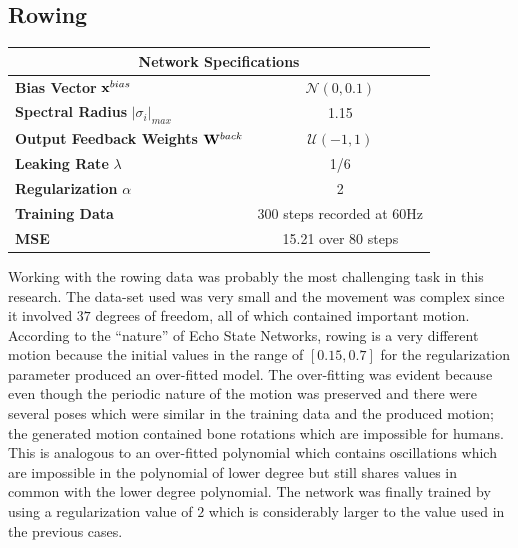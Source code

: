 \documentclass[letterpaper,9pt]{article}
\newcommand{\networkSpecs}[7]{
  \begin{center}
  \begin{tabular}{ | l | c | }
    \hline
    \multicolumn{2}{|c|}{{\bf Network Specifications}} \\
    \hline
    {\bf Bias Vector} ${\bf x}^{bias}$ & $\mathcal{N}(#1)$ \\
    \hline
    {\bf Spectral Radius} $|\sigma_i|_{max}$ & #2 \\
    \hline
    {\bf Output Feedback Weights} ${\bf W}^{back}$ & $\mathcal{U}(#3)$ \\
    \hline
    {\bf Leaking Rate} $\lambda$ & #4 \\
    \hline
    {\bf Regularization} $\alpha$ & #5\\
    \hline
    {\bf Training Data} & #6\\
    \hline
    {\bf MSE} & #7\\
    \hline
  \end{tabular}    
  \end{center}
}
\begin{document}
\subsection{Rowing}

\networkSpecs{0,0.1}
             {1.15}
             {-1,1}
             {1/6}
             {2}
             {300 steps recorded at 60Hz}
             {15.21 over 80 steps}

Working with the rowing data was probably the most challenging task in this research. The data-set used was very small and the movement was complex since it involved $37$ degrees of freedom, all of which contained important motion. \\

According to the ``nature'' of Echo State Networks, rowing is a very different motion because the initial values in the range of $[0.15,0.7]$ for the regularization parameter produced an over-fitted model. The over-fitting was evident because even though the periodic nature of the motion was preserved and there were several poses which were similar in the training data and the produced motion; the generated motion contained bone rotations which are impossible for humans. This is analogous to an over-fitted polynomial which contains oscillations which are impossible in the polynomial of lower degree but still shares values in common with the lower degree polynomial. The network was finally trained by using a regularization value of $2$ which is considerably larger to the value used in the previous cases.\pagebreak
\end{document}
